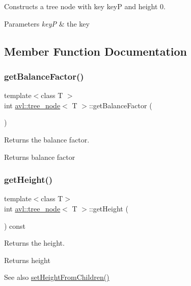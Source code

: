 Constructs a tree node with key keyP and height 0. 
\begin{DoxyParams}{Parameters}
{\em keyP} & the key \\
\hline
\end{DoxyParams}


\subsection{Member Function Documentation}
\mbox{\label{classavl_1_1tree__node_a9479f47445788e79be7ad81c2f9ca9c4}} 
\subsubsection{\texorpdfstring{get\+Balance\+Factor()}{getBalanceFactor()}}
{\footnotesize\ttfamily template$<$class T $>$ \\
int \hyperlink{classavl_1_1tree__node}{avl\+::tree\+\_\+node}$<$ T $>$\+::get\+Balance\+Factor (\begin{DoxyParamCaption}{ }\end{DoxyParamCaption})}

Returns the balance factor. \begin{DoxyReturn}{Returns}
balance factor 
\end{DoxyReturn}
\mbox{\label{classavl_1_1tree__node_ab298d8df03ff6414ff7280bbdbb16e8a}} 
\subsubsection{\texorpdfstring{get\+Height()}{getHeight()}}
{\footnotesize\ttfamily template$<$class T$>$ \\
int \hyperlink{classavl_1_1tree__node}{avl\+::tree\+\_\+node}$<$ T $>$\+::get\+Height (\begin{DoxyParamCaption}{ }\end{DoxyParamCaption}) const\hspace{0.3cm}{\ttfamily [inline]}}

Returns the height. \begin{DoxyReturn}{Returns}
height 
\end{DoxyReturn}
\begin{DoxySeeAlso}{See also}
\hyperlink{classavl_1_1tree__node_a5e3b8788433571c4b8462d2cf2d689b9}{set\+Height\+From\+Children()} 
\end{DoxySeeAlso}
\mbox{\label{classavl_1_1tree__node_a27d17e38312d380b79da420bbc0da99d}} 
